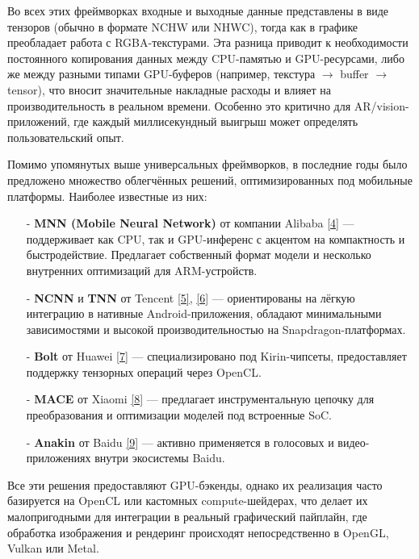\documentclass[a4paper,14pt]{extreport}
\begin{document}
            Во всех этих фреймворках входные и выходные данные представлены в виде тензоров (обычно в формате NCHW или NHWC), тогда как в графике преобладает работа с RGBA-текстурами. Эта разница приводит к необходимости постоянного копирования данных между CPU-памятью и GPU-ресурсами, либо же между разными типами GPU-буферов (например, текстура $\rightarrow$ buffer $\rightarrow$ tensor), что вносит значительные накладные расходы и влияет на производительность в реальном времени. Особенно это критично для AR/vision-приложений, где каждый миллисекундный выигрыш может определять пользовательский опыт.
            
            Помимо упомянутых выше универсальных фреймворков, в последние годы было предложено множество облегчённых решений, оптимизированных под мобильные платформы. Наиболее известные из них:
            \begin{itemize}
                \item[-] \textbf{MNN (Mobile Neural Network)} от компании Alibaba \hyperlink{[4]}{[4]} — поддерживает как CPU, так и GPU-инференс с акцентом на компактность и быстродействие. Предлагает собственный формат модели и несколько внутренних оптимизаций для ARM-устройств.
                \item[-] \textbf{NCNN} и \textbf{TNN} от Tencent \hyperlink{[5]}{[5]}, \hyperlink{[6]}{[6]} — ориентированы на лёгкую интеграцию в нативные Android-приложения, обладают минимальными зависимостями и высокой производительностью на Snapdragon-платформах.
                \item[-] \textbf{Bolt} от Huawei \hyperlink{[7]}{[7]} — специализировано под Kirin-чипсеты, предоставляет поддержку тензорных операций через OpenCL.
                \item[-] \textbf{MACE} от Xiaomi \hyperlink{[8]}{[8]} — предлагает инструментальную цепочку для преобразования и оптимизации моделей под встроенные SoC.
                \item[-] \textbf{Anakin} от Baidu \hyperlink{[9]}{[9]} — активно применяется в голосовых и видео-приложениях внутри экосистемы Baidu.
            \end{itemize}
            
            Все эти решения предоставляют GPU-бэкенды, однако их реализация часто базируется на OpenCL или кастомных compute-шейдерах, что делает их малопригодными для интеграции в реальный графический пайплайн, где обработка изображения и рендеринг происходят непосредственно в OpenGL, Vulkan или Metal.
            
\end{document}
